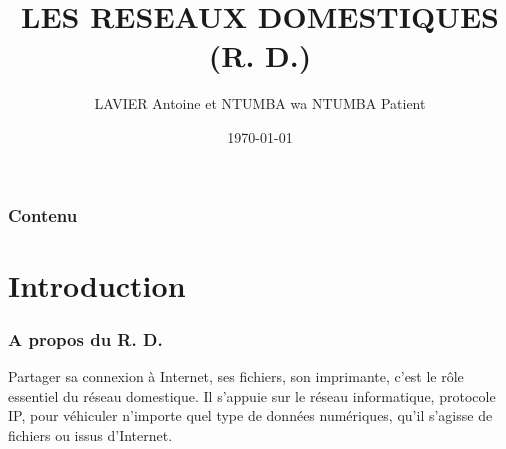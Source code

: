 \documentclass[handout]{beamer}
\begin{document}
\title{LES RESEAUX DOMESTIQUES (R. D.)}  
\author{LAVIER Antoine et NTUMBA wa NTUMBA Patient}
\date{\today} 

\begin{frame}
\titlepage
\end{frame} 

\begin{frame}
\frametitle{Contenu}
\tableofcontents
\end{frame} 




\section{Introduction}
\begin{frame}\frametitle{A propos du R. D.} 
Partager sa connexion à Internet, ses fichiers, son imprimante, c'est le rôle essentiel du réseau domestique. Il s'appuie sur le réseau informatique, protocole IP, pour véhiculer n'importe quel type de données numériques, qu'il s'agisse de fichiers ou issus d'Internet.
\end{frame}
\end{document}
